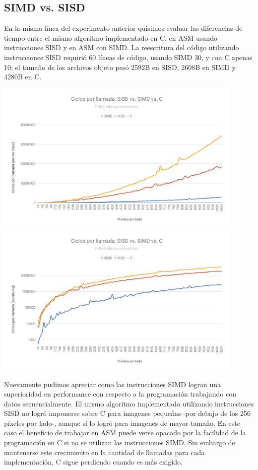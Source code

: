 \subsection{SIMD vs. SISD}

En la misma línea del experimento anterior quisimos evaluar las diferencias de tiempo entre el mismo algoritmo implementado en C, en ASM usando instrucciones SISD y en ASM con SIMD. La reescritura del código utilizando instrucciones SISD requirió 60 líneas de código, usando SIMD 30, y con C apenas 10; el tamaño de los archivos objeto pesó 2592B en SISD, 2608B en SIMD y 4280B en C.

\begin{center}

	\includegraphics[width=0.9\textwidth]{imagenes/simdsisd/SIMDvsSISDvsClin.png} \\
	\includegraphics[width=0.9\textwidth]{imagenes/simdsisd/SIMDvsSISDvsClog.png}

\end{center}

Nuevamente pudimos apreciar como las instrucciones SIMD logran una superioridad en performance con respecto a la programación trabajando con datos secuencialmente. El mismo algoritmo implementado utilizando instrucciones SISD no logró imponerse sobre C para imagenes pequeñas -por debajo de los 256 píxeles por lado-, aunque sí lo logró para imagenes de mayor tamaño. En este caso el beneficio de trabajar en ASM puede verse opacado por la facilidad de la programación en C si no se utilizan las instrucciones SIMD. Sin embargo de mantenerse este crecimiento en la cantidad de llamadas para cada implementación, C sigue perdiendo cuando es más exigido.

